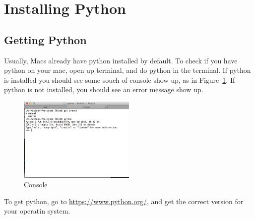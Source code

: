\documentclass[letterpaper,10pt]{article}
\begin{document}


\section{Installing Python}


\subsection{Getting Python}

Usually, Macs already have python installed by default. To check if you have python on your mac,
open up terminal, and do python in the terminal. If python is installed you should see some souch of console show up, as in Figure~\ref{fig:python_console}. If python is not installed, you should see an error message show up. 

\begin{figure}[h!]
  \centering
  \includegraphics[width=0.5\textwidth]{images/python_console}
  \caption{Console}
  \label{fig:python_console}
\end{figure}

To get python, go to \url{https://www.python.org/}, and get the correct version for your operatin system. 
\end{document}
